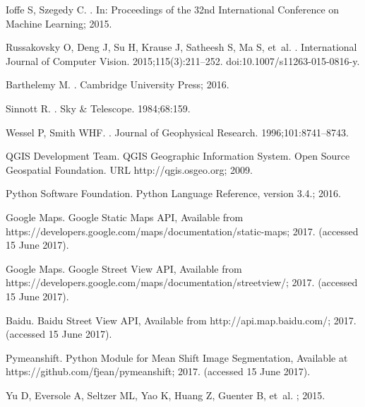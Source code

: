 Ioffe S, Szegedy C.
.
\newblock In: Proceedings of the 32nd International Conference on Machine
  Learning; 2015.

Russakovsky O, Deng J, Su H, Krause J, Satheesh S, Ma S, et~al.
.
\newblock International Journal of Computer Vision. 2015;115(3):211--252.
\newblock doi:{10.1007/s11263-015-0816-y}.

Barthelemy M.
.
\newblock Cambridge University Press; 2016.

Sinnott R.
.
\newblock Sky {\&} Telescope. 1984;68:159.

Wessel P, Smith WHF.
.
\newblock Journal of Geophysical Research. 1996;101:8741--8743.

{QGIS Development Team}. {QGIS Geographic Information System. Open Source
  Geospatial Foundation. URL http://qgis.osgeo.org}; 2009.

{Python Software Foundation}. {Python Language Reference, version 3.4.}; 2016.

{Google Maps}. {Google Static Maps API, Available from
  https://developers.google.com/maps/documentation/static-maps}; 2017.
\newblock (accessed 15 June 2017).

{Google Maps}. {Google Street View API, Available from
  https://developers.google.com/maps/documentation/streetview/}; 2017.
\newblock (accessed 15 June 2017).

Baidu. {Baidu Street View API, Available from http://api.map.baidu.com/}; 2017.
\newblock (accessed 15 June 2017).

Pymeanshift. {Python Module for Mean Shift Image Segmentation, Available at
  https://github.com/fjean/pymeanshift}; 2017.
\newblock (accessed 15 June 2017).

Yu D, Eversole A, Seltzer ML, Yao K, Huang Z, Guenter B, et~al.
; 2015.
  
